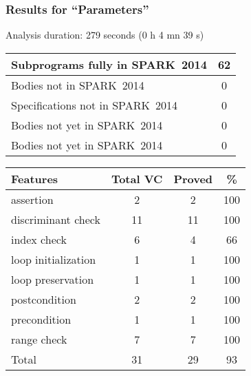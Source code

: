 \documentclass[10pt,a4paper,twocolumn]{article}
\newcommand{\newspark}{SPARK~2014\xspace}
\begin{document}
\subsubsection{Results for ``Parameters''}

Analysis duration: 279 seconds (0 h 4 mn 39 s)

\vspace{5mm}

\begin{tabular}{|l|c|}
\hline
Subprograms fully in \newspark  & 62 \\
\hline
Bodies not in \newspark         & 0  \\
\hline
Specifications not in \newspark & 0  \\
\hline
Bodies not yet in \newspark     & 0  \\
\hline
Bodies not yet in \newspark     & 0  \\
\hline
\end{tabular}

\vspace{5mm}

\begin{tabular}{|l|c|c|c|}
\hline
Features            & Total VC & Proved & \%  \\ %
\hline
assertion           & 2        & 2      & 100 \\ %
\hline
discriminant check  & 11       & 11     & 100 \\ %
\hline
index check         & 6        & 4      & 66  \\ %
\hline
loop initialization & 1        & 1      & 100 \\ %
\hline
loop preservation   & 1        & 1      & 100 \\ %
\hline
postcondition       & 2        & 2      & 100 \\ %
\hline
precondition        & 1        & 1      & 100 \\ %
\hline
range check         & 7        & 7      & 100 \\ %
\hline
Total               & 31       & 29     & 93  \\ %
\hline
\end{tabular}
\end{document}
